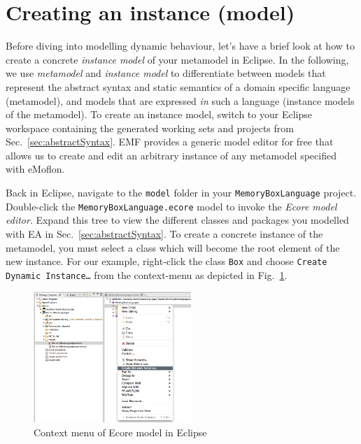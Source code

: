 \section{Creating an instance (model)}
\label{sect:instance}

Before diving into modelling dynamic behaviour, let's have a brief look at how
to create a concrete \emph{instance model} of your metamodel in Eclipse.
In the following, we use \emph{metamodel} and \emph{instance model} to
differentiate between models that represent the abstract syntax and
static semantics of a domain specific language (metamodel), and models that are
expressed \emph{in} such a language (instance models of the metamodel).
 To create an instance model, switch to your Eclipse workspace containing
the generated working sets and projects from Sec.~\ref{sec:abstractSyntax}.
EMF provides a generic model editor for free that allows us to create and edit
an arbitrary instance of any metamodel specified with eMoflon. 

Back in Eclipse, navigate to the \texttt{model} folder in your
\texttt{MemoryBoxLanguage} project.  Double-click the
\texttt{MemoryBoxLanguage.ecore} model to invoke  the \emph{Ecore model editor}. 
Expand this tree to view the different classes and packages you modelled with EA
in Sec.~\ref{sec:abstractSyntax}.
To create a concrete instance of the metamodel, you must select a class which
will become the root element of the new instance.
For our example, right-click the class \texttt{Box} and choose \texttt{Create
Dynamic Instance\ldots} from the context-menu as depicted in
Fig.~\ref{fig:context_menu}. 

\begin{figure}[htbp]
	\centering 
  \includegraphics[width=0.53\textwidth]{pics/modelBrowserBilder/createInstance.png} 
	\caption{Context menu of Ecore model in Eclipse}
	\label{fig:context_menu}
\end{figure}


